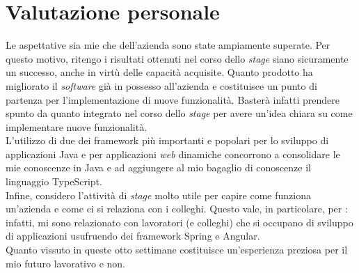 \section{Valutazione personale}
Le aspettative sia mie che dell'azienda sono state ampiamente superate. Per
questo motivo, ritengo i risultati ottenuti nel corso dello \textit{stage}
siano
sicuramente un successo, anche in virtù delle capacità acquisite. Quanto
prodotto ha migliorato il \textit{software} già in possesso all'azienda
e costituisce un punto di partenza per l'implementazione di nuove funzionalità.
Basterà infatti prendere spunto da quanto integrato nel corso dello
\textit{stage} per avere un'idea chiara su come implementare nuove
funzionalità. \\
L'utilizzo di due dei \gls{framework} più importanti e popolari per lo sviluppo
di applicazioni Java e per applicazioni \textit{web} dinamiche concorrono a
consolidare le mie conoscenze in Java e ad aggiungere al mio bagaglio di
conoscenze il linguaggio TypeScript.  \\
Infine, considero l'attività di \textit{stage} molto utile per capire come
funziona un'azienda e come ci si relaziona con i colleghi. Questo vale, in
particolare, per \myCompany: infatti, mi sono relazionato con lavoratori (e
colleghi) che si occupano di sviluppo di applicazioni usufruendo dei
\gls{framework} Spring e Angular.\\
Quanto vissuto in queste otto settimane costituisce un'esperienza
preziosa per il mio futuro lavorativo e non.